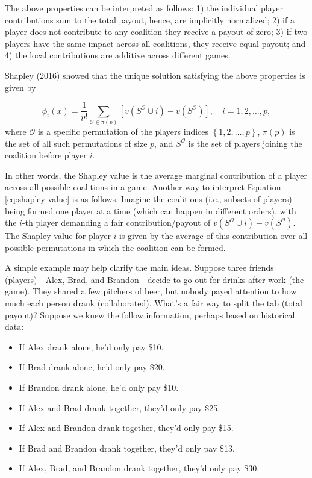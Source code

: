 The above properties can be interpreted as follows: 1) the individual player contributions sum to the total payout, hence, are implicitly normalized; 2) if a player does not contribute to any coalition they receive a payout of zero; 3) if two players have the same impact across all coalitions, they receive equal payout; and 4) the local contributions are additive across different games.

Shapley (2016) showed that the unique solution satisfying the above properties is given by

\begin{equation}
\phi_i\left(x\right) = \frac{1}{p!} \sum_{\mathcal{O} \in \pi\left(p\right)} \left[v\left(S^\mathcal{O} \cup i\right) - v\left(S^\mathcal{O}\right)\right], \quad i = 1, 2, \dots, p,
  \label{eq:shapley-value}
\end{equation}
where \(\mathcal{O}\) is a specific permutation of the players indices \(\left\{1, 2, \dots, p\right\}\), \(\pi\left(p\right)\) is the set of all such permutations of size \(p\), and \(S^\mathcal{O}\) is the set of players joining the coalition before player \(i\).

In other words, the Shapley value is the average marginal contribution of a player across all possible coalitions in a game. Another way to interpret Equation \eqref{eq:shapley-value} is as follows. Imagine the coalitions (i.e., subsets of players) being formed one player at a time (which can happen in different orders), with the \(i\)-th player demanding a fair contribution/payout of \(v\left(S^\mathcal{O} \cup i\right) - v\left(S^\mathcal{O}\right)\). The Shapley value for player \(i\) is given by the average of this contribution over all possible permutations in which the coalition can be formed.

A simple example may help clarify the main ideas. Suppose three friends (players)---Alex, Brad, and Brandon---decide to go out for drinks after work (the game). They shared a few pitchers of beer, but nobody payed attention to how much each person drank (collaborated). What's a fair way to split the tab (total payout)? Suppose we knew the follow information, perhaps based on historical data:

\begin{itemize}
\item
  If Alex drank alone, he'd only pay \$10.
\item
  If Brad drank alone, he'd only pay \$20.
\item
  If Brandon drank alone, he'd only pay \$10.
\item
  If Alex and Brad drank together, they'd only pay \$25.
\item
  If Alex and Brandon drank together, they'd only pay \$15.
\item
  If Brad and Brandon drank together, they'd only pay \$13.
\item
  If Alex, Brad, and Brandon drank together, they'd only pay \$30.
\end{itemize}

